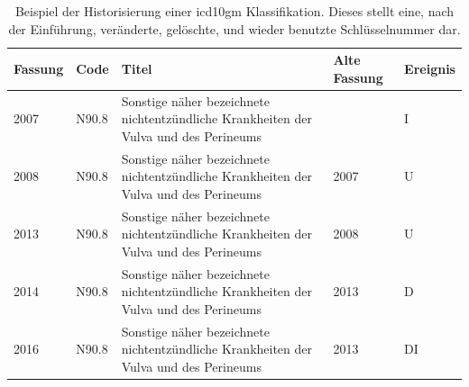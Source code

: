 \begin{table}[ht]
	\centering
	\small
	\caption[Beispiel der Historisierung einer \acs{icd10gm} Klassifikation]{Beispiel der Historisierung einer \acs{icd10gm} Klassifikation. Dieses stellt eine, nach der Einführung, veränderte, gelöschte, und wieder benutzte Schlüsselnummer dar.}
	\label{tab:IUDDI}
	\begin{tabular}{|l|l|p{6cm}|l|l|}
		\hline
		\rowcolor{lightgray} Fassung & Code & Titel & Alte Fassung & Ereignis \\ \hline
			2007 & N90.8  & Sonstige näher bezeichnete nichtentzündliche Krankheiten der Vulva und des Perineums &  & I \\ \hline
			2008 & N90.8  & Sonstige näher bezeichnete nichtentzündliche Krankheiten der Vulva und des Perineums & 2007 & U \\ \hline
			2013 & N90.8  & Sonstige näher bezeichnete nichtentzündliche Krankheiten der Vulva und des Perineums & 2008 & U \\ \hline
			2014 & N90.8  & Sonstige näher bezeichnete nichtentzündliche Krankheiten der Vulva und des Perineums & 2013 & D \\ \hline
			2016 & N90.8  & Sonstige näher bezeichnete nichtentzündliche Krankheiten der Vulva und des Perineums & 2013 & DI \\ \hline
	\end{tabular}
\end{table}



